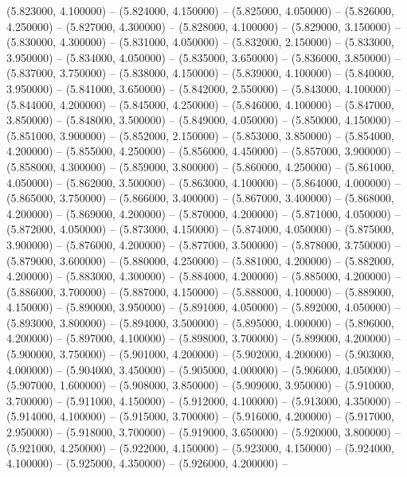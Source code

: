 (5.823000, 4.100000) -- 
(5.824000, 4.150000) -- 
(5.825000, 4.050000) -- 
(5.826000, 4.250000) -- 
(5.827000, 4.300000) -- 
(5.828000, 4.100000) -- 
(5.829000, 3.150000) -- 
(5.830000, 4.300000) -- 
(5.831000, 4.050000) -- 
(5.832000, 2.150000) -- 
(5.833000, 3.950000) -- 
(5.834000, 4.050000) -- 
(5.835000, 3.650000) -- 
(5.836000, 3.850000) -- 
(5.837000, 3.750000) -- 
(5.838000, 4.150000) -- 
(5.839000, 4.100000) -- 
(5.840000, 3.950000) -- 
(5.841000, 3.650000) -- 
(5.842000, 2.550000) -- 
(5.843000, 4.100000) -- 
(5.844000, 4.200000) -- 
(5.845000, 4.250000) -- 
(5.846000, 4.100000) -- 
(5.847000, 3.850000) -- 
(5.848000, 3.500000) -- 
(5.849000, 4.050000) -- 
(5.850000, 4.150000) -- 
(5.851000, 3.900000) -- 
(5.852000, 2.150000) -- 
(5.853000, 3.850000) -- 
(5.854000, 4.200000) -- 
(5.855000, 4.250000) -- 
(5.856000, 4.450000) -- 
(5.857000, 3.900000) -- 
(5.858000, 4.300000) -- 
(5.859000, 3.800000) -- 
(5.860000, 4.250000) -- 
(5.861000, 4.050000) -- 
(5.862000, 3.500000) -- 
(5.863000, 4.100000) -- 
(5.864000, 4.000000) -- 
(5.865000, 3.750000) -- 
(5.866000, 3.400000) -- 
(5.867000, 3.400000) -- 
(5.868000, 4.200000) -- 
(5.869000, 4.200000) -- 
(5.870000, 4.200000) -- 
(5.871000, 4.050000) -- 
(5.872000, 4.050000) -- 
(5.873000, 4.150000) -- 
(5.874000, 4.050000) -- 
(5.875000, 3.900000) -- 
(5.876000, 4.200000) -- 
(5.877000, 3.500000) -- 
(5.878000, 3.750000) -- 
(5.879000, 3.600000) -- 
(5.880000, 4.250000) -- 
(5.881000, 4.200000) -- 
(5.882000, 4.200000) -- 
(5.883000, 4.300000) -- 
(5.884000, 4.200000) -- 
(5.885000, 4.200000) -- 
(5.886000, 3.700000) -- 
(5.887000, 4.150000) -- 
(5.888000, 4.100000) -- 
(5.889000, 4.150000) -- 
(5.890000, 3.950000) -- 
(5.891000, 4.050000) -- 
(5.892000, 4.050000) -- 
(5.893000, 3.800000) -- 
(5.894000, 3.500000) -- 
(5.895000, 4.000000) -- 
(5.896000, 4.200000) -- 
(5.897000, 4.100000) -- 
(5.898000, 3.700000) -- 
(5.899000, 4.200000) -- 
(5.900000, 3.750000) -- 
(5.901000, 4.200000) -- 
(5.902000, 4.200000) -- 
(5.903000, 4.000000) -- 
(5.904000, 3.450000) -- 
(5.905000, 4.000000) -- 
(5.906000, 4.050000) -- 
(5.907000, 1.600000) -- 
(5.908000, 3.850000) -- 
(5.909000, 3.950000) -- 
(5.910000, 3.700000) -- 
(5.911000, 4.150000) -- 
(5.912000, 4.100000) -- 
(5.913000, 4.350000) -- 
(5.914000, 4.100000) -- 
(5.915000, 3.700000) -- 
(5.916000, 4.200000) -- 
(5.917000, 2.950000) -- 
(5.918000, 3.700000) -- 
(5.919000, 3.650000) -- 
(5.920000, 3.800000) -- 
(5.921000, 4.250000) -- 
(5.922000, 4.150000) -- 
(5.923000, 4.150000) -- 
(5.924000, 4.100000) -- 
(5.925000, 4.350000) -- 
(5.926000, 4.200000) -- 
